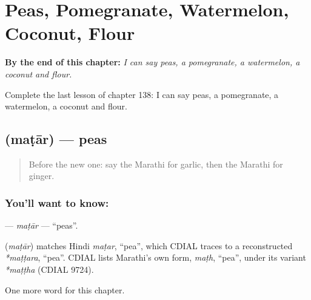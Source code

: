 
\chapter{Peas, Pomegranate, Watermelon, Coconut, Flour}
\label{ch:mr-peas-pomegranate-watermelon-coconut-flour}

\begin{chapteropening}
\textbf{By the end of this chapter:} \emph{I can say peas, a pomegranate, a watermelon, a coconut and flour.}

Complete the last lesson of chapter 138: I can say peas, a pomegranate, a watermelon, a coconut and flour.
\end{chapteropening}

\section[\texorpdfstring{\mr{मटार} (maṭār)}{मटार (maṭār)}]{ (maṭār) — peas}

\label{lesson:MR-C138-matar}



\begin{quote}
Before the new one: say the Marathi for garlic, then the Marathi for ginger.
\end{quote}

\subsection*{You'll want to know: }
\textbf{} — \emph{maṭār} — \textquotedblleft{}peas\textquotedblright{}.

\begin{cousinweb}
\textbf{} (\emph{maṭār}) matches Hindi \emph{maṭar}, \textquotedblleft{}pea\textquotedblright{}, which CDIAL traces to a reconstructed \emph{*maṭṭara}, \textquotedblleft{}pea\textquotedblright{}. CDIAL lists Marathi's own form, \emph{maṭh}, \textquotedblleft{}pea\textquotedblright{}, under its variant \emph{*maṭṭha} (CDIAL 9724).
\end{cousinweb}

\begin{grammarlens}[title={What you've built}]
One more word for this chapter.
\end{grammarlens}

